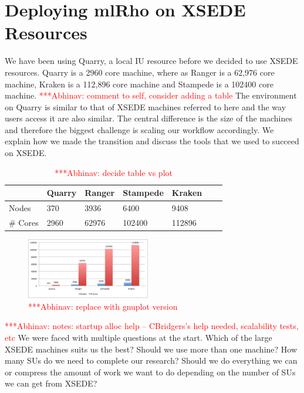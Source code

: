 \documentclass{sig-alternate}
\newcommand{\abhi}[1]{ {\textcolor{red} { ***Abhinav: #1 }}}
\newcommand{\abhi}[1]{ {}}
\begin{document}
\section{Deploying mlRho on XSEDE Resources}\label{sec:resources}
We have been using Quarry, a local IU resource before we decided to use XSEDE resources. Quarry is a 2960 core machine, where as Ranger is a 62,976 core machine, Kraken is a 112,896 core machine and Stampede is a 102400 core machine. \abhi{comment to self, consider adding a table}  The environment on Quarry is similar to that of XSEDE machines referred to here and the way users access it are also similar. The central difference is the size of the machines and therefore the biggest challenge is scaling our workflow accordingly. We explain how we made the transition and discuss the tools that we used to succeed on XSEDE.
\begin{table}
\centering
\begin{tabular}{| l  | l  | l  | l  | l  | l  | l  |} \hline
	&Quarry & Ranger & Stampede & Kraken\\ \hline
Nodes & 370 & 3936 & 6400 & 9408   \\ \hline
\# Cores	& 2960  & 62976&102400 & 112896\\ 
\hline

\end{tabular}
\caption{\abhi{decide table vs plot}  } 
\label{table:cache_comp}
\end{table}


\begin{figure} %
\centering
\includegraphics[width=0.48\textwidth]{figures/cores-nodes.png}
\caption{\abhi{replace with gnuplot version}}
\label{fig:scaling}
\end{figure}

\abhi{notes: startup alloc help -- CBridgers's help needed, scalability tests, etc}
We were faced with multiple questions at the start. Which of the large XSEDE machines suits us the best? Should we use more than one machine? How many SUs do we need to complete our research? Should we do everything we can or compress the amount of work we want to do depending on the number of SUs we can get from XSEDE?
\end{document}
